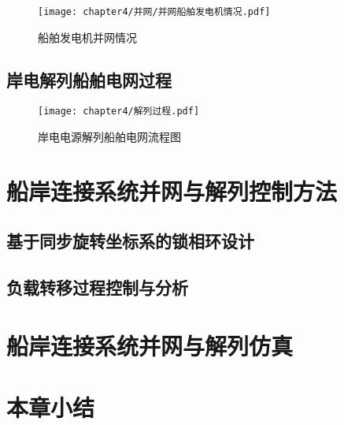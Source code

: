\begin{figure}[!htp]
	\centering
	\texttt{[image: chapter4/并网/并网船舶发电机情况.pdf]}
	\caption{船舶发电机并网情况}
	\label{fig:船舶发电机并网情况}
\end{figure}


\subsection{岸电解列船舶电网过程}

\begin{figure}[!htp]
	\centering
	\texttt{[image: chapter4/解列过程.pdf]}
	\caption{岸电电源解列船舶电网流程图}
	\label{fig:岸电电源解列船舶电网流程图}
\end{figure}

\section{船岸连接系统并网与解列控制方法}

\subsection{基于同步旋转坐标系的锁相环设计}

\subsection{负载转移过程控制与分析}

\begin{table}[!htp]
	\centering
	\caption[电压和频率波动表]{电压和频率波动表\cite{SP7}}
	\label{tab:电压和频率波动表}
\end{table}

\section{船岸连接系统并网与解列仿真}




\section{本章小结}




